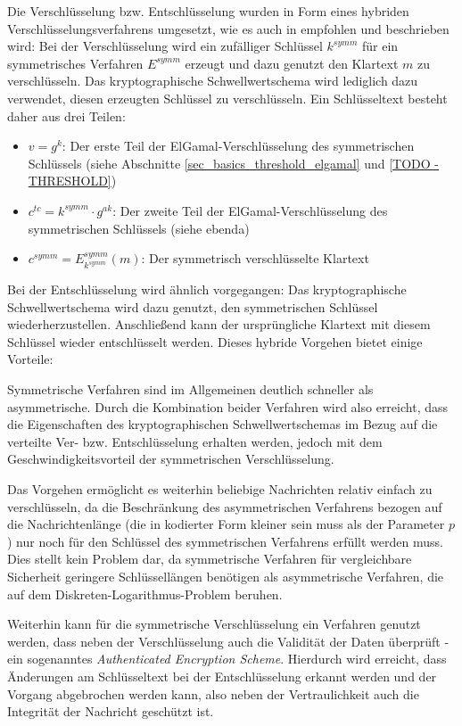   Die Verschlüsselung bzw. Entschlüsselung wurden in Form eines hybriden Verschlüsselungsverfahrens umgesetzt, wie es auch in \cite{katz2014} empfohlen und beschrieben wird: Bei der Verschlüsselung wird ein zufälliger Schlüssel \(k^{symm}\) für ein symmetrisches Verfahren \(E^{symm}\) erzeugt und dazu genutzt den Klartext \(m\) zu verschlüsseln. Das kryptographische Schwellwertschema wird lediglich dazu verwendet, diesen erzeugten Schlüssel zu verschlüsseln. Ein Schlüsseltext besteht daher aus drei Teilen: 
  \begin{itemize}
    \item \(v = g^k\): Der erste Teil der ElGamal-Verschlüsselung des symmetrischen Schlüssels (siehe Abschnitte \ref{sec_basics_threshold_elgamal} und \ref{TODO - THRESHOLD})
    \item \(c^{tc} = k^{symm} \cdot g^{ak}\): Der zweite Teil der ElGamal-Verschlüsselung des symmetrischen Schlüssels (siehe ebenda)
    \item \(c^{symm} = E^{symm}_{k^{symm}}(m)\): Der symmetrisch verschlüsselte Klartext
  \end{itemize}
  
  Bei der Entschlüsselung wird ähnlich vorgegangen: Das kryptographische Schwellwertschema wird dazu genutzt, den symmetrischen Schlüssel wiederherzustellen. Anschließend kann der ursprüngliche Klartext mit diesem Schlüssel wieder entschlüsselt werden. Dieses hybride Vorgehen bietet einige Vorteile: 
  
  Symmetrische Verfahren sind im Allgemeinen deutlich schneller als asymmetrische. Durch die Kombination beider Verfahren wird also erreicht, dass die Eigenschaften des kryptographischen Schwellwertschemas im Bezug auf die verteilte Ver- bzw. Entschlüsselung erhalten werden, jedoch mit dem Geschwindigkeitsvorteil der symmetrischen Verschlüsselung. 
  
  Das Vorgehen ermöglicht es weiterhin beliebige Nachrichten relativ einfach zu verschlüsseln, da die Beschränkung des asymmetrischen Verfahrens bezogen auf die Nachrichtenlänge (die in kodierter Form kleiner sein muss als der Parameter \(p\)) nur noch für den Schlüssel des symmetrischen Verfahrens erfüllt werden muss. Dies stellt kein Problem dar, da symmetrische Verfahren für vergleichbare Sicherheit geringere Schlüssellängen benötigen als asymmetrische Verfahren, die auf dem Diskreten-Logarithmus-Problem beruhen.
  
  Weiterhin kann für die symmetrische Verschlüsselung ein Verfahren genutzt werden, dass neben der Verschlüsselung auch die Validität der Daten überprüft - ein sogenanntes \textit{Authenticated Encryption Scheme}. Hierdurch wird erreicht, dass Änderungen am Schlüsseltext bei der Entschlüsselung erkannt werden und der Vorgang abgebrochen werden kann, also neben der Vertraulichkeit auch die Integrität der Nachricht geschützt ist. 
  
